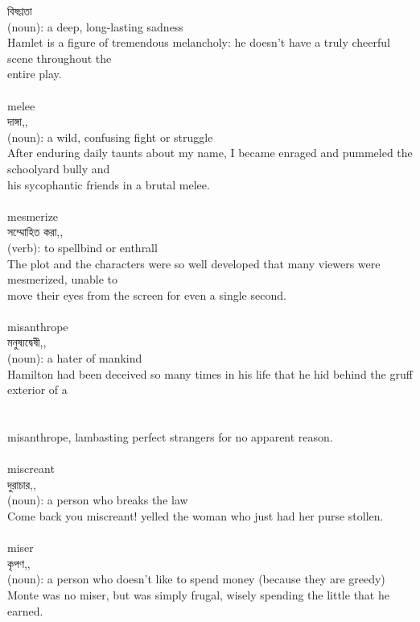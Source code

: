 \documentclass{article}
\begin{document}
{বিষণ্ণতা}\\
{(noun): a deep, long-lasting sadness\\Hamlet is a figure of tremendous melancholy: he doesn't have a truly cheerful scene throughout the\\entire play.\\}\\
{melee}\\
{দাঙ্গা,,}\\
{(noun): a wild, confusing fight or struggle\\After enduring daily taunts about my name, I became enraged and pummeled the schoolyard bully and\\his sycophantic friends in a brutal melee.\\}\\
{mesmerize}\\
{সম্মোহিত করা,,}\\
{(verb): to spellbind or enthrall\\The plot and the characters were so well developed that many viewers were mesmerized, unable to\\move their eyes from the screen for even a single second.\\}\\
{misanthrope}\\
{মনুষ্যদ্বেষী,,}\\
{(noun): a hater of mankind\\Hamilton had been deceived so many times in his life that he hid behind the gruff exterior of a\\\\                                                                               \\misanthrope, lambasting perfect strangers for no apparent reason.\\}\\
{miscreant}\\
{দুরাচার,,}\\
{(noun): a person who breaks the law\\Come back you miscreant! yelled the woman who just had her purse stollen.\\}\\
{miser}\\
{কৃপণ,,}\\
{(noun): a person who doesn't like to spend money (because they are greedy)\\Monte was no miser, but was simply frugal, wisely spending the little that he earned.\\}\\
\end{document}
